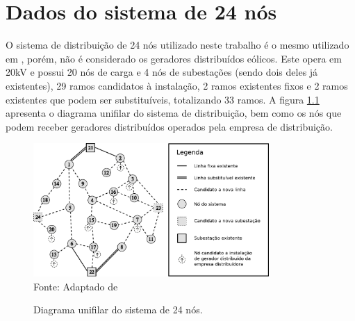 \chapter{Dados do sistema de 24 nós}
\label{anex:24barras}
O sistema de distribuição de 24 nós utilizado neste trabalho é o mesmo utilizado em , porém, não é considerado os geradores distribuídos eólicos. Este opera em 20kV e possui 20 nós de carga e 4 nós de subestações (sendo dois deles já existentes), 29 ramos candidatos à instalação, 2 ramos existentes fixos e 2 ramos existentes que podem ser substituíveis, totalizando 33 ramos. A figura \ref{fig:24bus} apresenta o diagrama unifilar do sistema de distribuição, bem como os nós que podem receber geradores distribuídos operados pela empresa de distribuição.
\begin{figure}[ht]
 	\centering
    \caption{Diagrama unifilar do sistema de 24 nós.}
    \includegraphics[width=0.8\textwidth]{Anexos/24-bus-system.pdf}\\
    Fonte: Adaptado de 
    \label{fig:24bus}
\end{figure}



